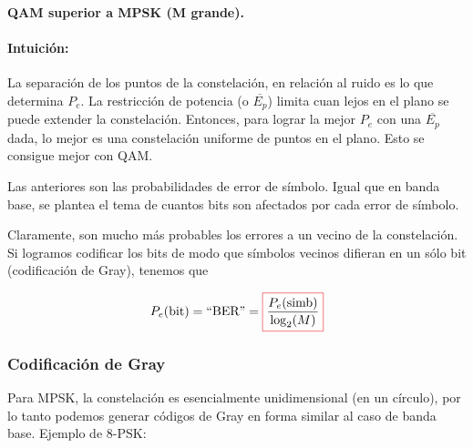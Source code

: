  {\bf QAM superior a MPSK (M
grande).}

\paragraph{Intuición: } La separación de los puntos de la constelación, en relación al ruido es lo que determina $P_e$.
La restricción de potencia (o $\overline{E_p}$) limita cuan lejos
en el plano se puede extender la constelación. Entonces, para
lograr la mejor $P_e$ con una $\overline{E_p}$ dada, lo mejor es
una constelación uniforme de puntos en el plano. Esto se consigue
mejor con QAM.

\begin{figure}[htb]
    \centering
\end{figure}
\FloatBarrier

Las anteriores son las probabilidades de error de símbolo. Igual
que en banda base, se plantea el tema de cuantos bits son
afectados por cada error de símbolo.

Claramente, son mucho más probables los errores a un vecino de la
constelación. Si logramos codificar los bits de modo que símbolos
vecinos difieran en un sólo bit (codificación de Gray), tenemos
que


\[P_e(\text{bit})=\text{``BER''} = \col{\frac{P_e(\text{simb})}{\log_2(M)}}\]

\subsubsection*{Codificación de Gray}

Para MPSK, la constelación es esencialmente unidimensional (en un
círculo), por lo tanto podemos generar códigos de Gray en forma
similar al caso de banda base. Ejemplo de 8-PSK:


